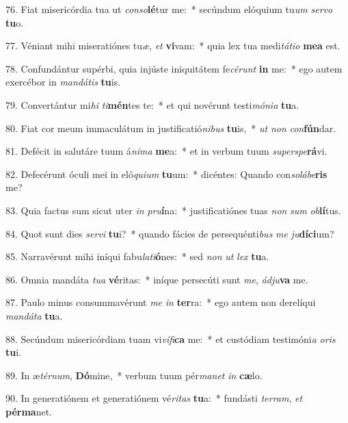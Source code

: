 76. Fiat misericórdia tua ut \textit{con}\textit{so}\textbf{lé}tur me:~*  secúndum elóquium tu\textit{um} \textit{ser}\textit{vo} \textbf{tu}o.\

77. Véniant mihi miseratiónes tu\textit{æ}, \textit{et} \textbf{vi}vam:~*  quia lex tua medi\textit{tá}\textit{ti}\textit{o} \textbf{me}\textbf{a} est.\

78. Confundántur supérbi, quia injúste iniquitátem fe\textit{cé}\textit{runt} \textbf{in} me:~*  ego autem exercébor in \textit{man}\textit{dá}\textit{tis} \textbf{tu}is.\

79. Convertántur mi\textit{hi} \textit{ti}\textbf{mén}tes te:~*  et qui novérunt testi\textit{mó}\textit{ni}\textit{a} \textbf{tu}a.\

80. Fiat cor meum immaculátum in justificatió\textit{ni}\textit{bus} \textbf{tu}is,~*  \textit{ut} \textit{non} \textit{con}\textbf{fún}dar.\

81. Defécit in salutáre tuum á\textit{ni}\textit{ma} \textbf{me}a:~*  et in verbum tuum \textit{su}\textit{per}\textit{spe}\textbf{rá}vi.\

82. Defecérunt óculi mei in eló\textit{qui}\textit{um} \textbf{tu}um:~*  dicéntes: Quando con\textit{so}\textit{lá}\textit{be}\textbf{ris} me?\

83. Quia factus sum sicut uter \textit{in} \textit{pru}\textbf{í}na:~*  justificatiónes tuas \textit{non} \textit{sum} \textit{ob}\textbf{lí}tus.\

84. Quot sunt dies \textit{ser}\textit{vi} \textbf{tu}i?~*  quando fácies de persequénti\textit{bus} \textit{me} \textit{ju}\textbf{dí}\textbf{ci}um?\

85. Narravérunt mihi iníqui fabu\textit{la}\textit{ti}\textbf{ó}nes:~*  sed \textit{non} \textit{ut} \textit{lex} \textbf{tu}a.\

86. Omnia mandáta \textit{tu}\textit{a} \textbf{vé}ritas:~*  iníque persecúti sunt \textit{me}, \textit{ád}\textit{ju}\textbf{va} me.\

87. Paulo minus consummavérunt \textit{me} \textit{in} \textbf{ter}ra:~*  ego autem non derelíqui \textit{man}\textit{dá}\textit{ta} \textbf{tu}a.\

88. Secúndum misericórdiam tuam vi\textit{ví}\textit{fi}\textbf{ca} me:~*  et custódiam testimóni\textit{a} \textit{o}\textit{ris} \textbf{tu}i.\

89. In æ\textit{tér}\textit{num}, \textbf{Dó}mine,~*  verbum tuum pér\textit{ma}\textit{net} \textit{in} \textbf{cæ}lo.\

90. In generatiónem et generatiónem vé\textit{ri}\textit{tas} \textbf{tu}a:~*  fundásti \textit{ter}\textit{ram}, \textit{et} \textbf{pér}\textbf{ma}net.\

